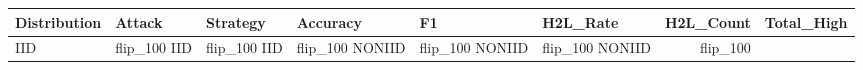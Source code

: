 \begin{tabular}{llllllrr}
\toprule
Distribution & Attack & Strategy & Accuracy & F1 & H2L_Rate & H2L_Count & Total_High \\
\midrule
IID & flip_100%
IID & flip_100%
IID & flip_100%
NONIID & flip_100%
NONIID & flip_100%
NONIID & flip_100%
\bottomrule
\end{tabular}
